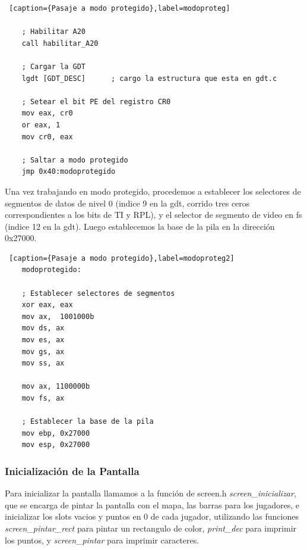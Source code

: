 \documentclass[a4paper]{article}
\begin{document}
\begin{lstlisting} [caption={Pasaje a modo protegido},label=modoproteg]
    
    ; Habilitar A20
    call habilitar_A20  
   
    ; Cargar la GDT
	lgdt [GDT_DESC]      ; cargo la estructura que esta en gdt.c

    ; Setear el bit PE del registro CR0
    mov eax, cr0
	or eax, 1
	mov cr0, eax

    ; Saltar a modo protegido
	jmp 0x40:modoprotegido

\end{lstlisting}

\newpage

\par Una vez trabajando en modo protegido, procedemos a establecer los selectores de segmentos de datos de nivel 0 (indice 9 en la gdt, corrido tres ceros correspondientes a los bits de TI y RPL), y el selector de segmento de video en fs (indice 12 en la gdt). Luego establecemos la base de la pila en la dirección 0x27000.


\begin{lstlisting} [caption={Pasaje a modo protegido},label=modoproteg2]
    modoprotegido:
    
    ; Establecer selectores de segmentos
    xor eax, eax
	mov ax,  1001000b
	mov ds, ax
	mov es, ax
	mov gs, ax
	mov ss, ax
    
	mov ax, 1100000b
    mov fs, ax

    ; Establecer la base de la pila
	mov ebp, 0x27000
	mov esp, 0x27000

\end{lstlisting}

\subsubsection*{Inicialización de la Pantalla}

\par Para inicializar la pantalla llamamos a la función de screen.h \emph{screen_inicializar}, que se encarga de pintar la pantalla con el mapa, las barras para los jugadores, e inicializar los slots vacios y puntos en 0 de cada jugador, utilizando las funciones \emph{screen_pintar_rect} para pintar un rectangulo de color, \emph{print_dec} para imprimir los puntos, y \emph{screen_pintar} para imprimir caracteres.
\end{document}
